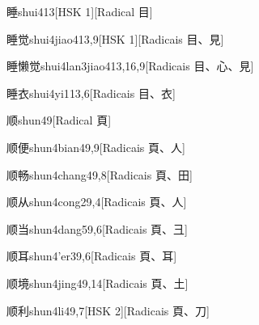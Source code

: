 \begin{entry}{睡}{shui4}{13}[HSK 1][Radical ⽬]
\end{entry}

\begin{entry}{睡觉}{shui4jiao4}{13,9}[HSK 1][Radicais ⽬、⾒]
\end{entry}

\begin{entry}{睡懒觉}{shui4lan3jiao4}{13,16,9}[Radicais ⽬、⼼、⾒]
\end{entry}

\begin{entry}{睡衣}{shui4yi1}{13,6}[Radicais ⽬、⾐]
\end{entry}

\begin{entry}{顺}{shun4}{9}[Radical ⾴]
\end{entry}

\begin{entry}{顺便}{shun4bian4}{9,9}[Radicais ⾴、⼈]
\end{entry}

\begin{entry}{顺畅}{shun4chang4}{9,8}[Radicais ⾴、⽥]
\end{entry}

\begin{entry}{顺从}{shun4cong2}{9,4}[Radicais ⾴、⼈]
\end{entry}

\begin{entry}{顺当}{shun4dang5}{9,6}[Radicais ⾴、⼹]
\end{entry}

\begin{entry}{顺耳}{shun4'er3}{9,6}[Radicais ⾴、⽿]
\end{entry}

\begin{entry}{顺境}{shun4jing4}{9,14}[Radicais ⾴、⼟]
\end{entry}

\begin{entry}{顺利}{shun4li4}{9,7}[HSK 2][Radicais ⾴、⼑]
\end{entry}

